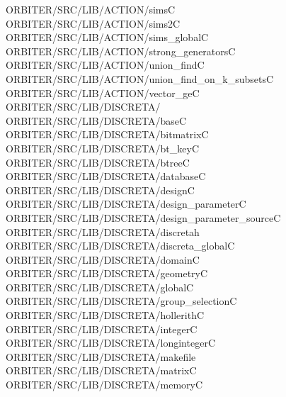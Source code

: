 \begin{tabbing}
ORBITER/SRC/LIB/ACTION/simsC\\[0pt]
ORBITER/SRC/LIB/ACTION/sims2C\\[0pt]
ORBITER/SRC/LIB/ACTION/sims\_globalC\\[0pt]
ORBITER/SRC/LIB/ACTION/strong\_generatorsC\\[0pt]
ORBITER/SRC/LIB/ACTION/union\_findC\\[0pt]
ORBITER/SRC/LIB/ACTION/union\_find\_on\_k\_subsetsC\\[0pt]
ORBITER/SRC/LIB/ACTION/vector\_geC\\[0pt]
ORBITER/SRC/LIB/DISCRETA/\\[0pt]
ORBITER/SRC/LIB/DISCRETA/baseC\\[0pt]
ORBITER/SRC/LIB/DISCRETA/bitmatrixC\\[0pt]
ORBITER/SRC/LIB/DISCRETA/bt\_keyC\\[0pt]
ORBITER/SRC/LIB/DISCRETA/btreeC\\[0pt]
ORBITER/SRC/LIB/DISCRETA/databaseC\\[0pt]
ORBITER/SRC/LIB/DISCRETA/designC\\[0pt]
ORBITER/SRC/LIB/DISCRETA/design\_parameterC\\[0pt]
ORBITER/SRC/LIB/DISCRETA/design\_parameter\_sourceC\\[0pt]
ORBITER/SRC/LIB/DISCRETA/discretah\\[0pt]
ORBITER/SRC/LIB/DISCRETA/discreta\_globalC\\[0pt]
ORBITER/SRC/LIB/DISCRETA/domainC\\[0pt]
ORBITER/SRC/LIB/DISCRETA/geometryC\\[0pt]
ORBITER/SRC/LIB/DISCRETA/globalC\\[0pt]
ORBITER/SRC/LIB/DISCRETA/group\_selectionC\\[0pt]
ORBITER/SRC/LIB/DISCRETA/hollerithC\\[0pt]
ORBITER/SRC/LIB/DISCRETA/integerC\\[0pt]
ORBITER/SRC/LIB/DISCRETA/longintegerC\\[0pt]
ORBITER/SRC/LIB/DISCRETA/makefile\\[0pt]
ORBITER/SRC/LIB/DISCRETA/matrixC\\[0pt]
ORBITER/SRC/LIB/DISCRETA/memoryC\\[0pt]

\end{tabbing}
